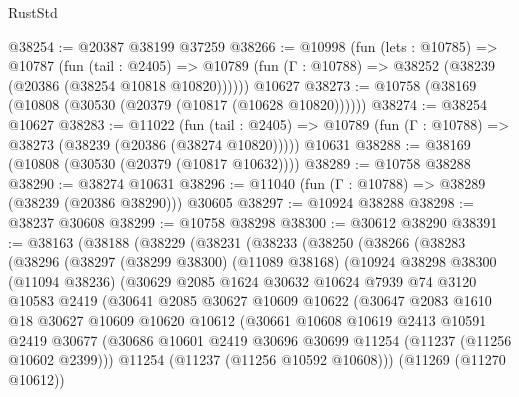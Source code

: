 \begin{lexlean}{RustStd}
\begin{coremodule}
@38254 := @20387 @38199 @37259
@38266 := @10998
    (fun (lets : @10785) =>
    @10787
      (fun (tail : @2405) =>
      @10789 (fun (Γ : @10788) => @38252 (@38239 (@20386 (@38254 @10818 @10820))))))
    @10627
@38273 := @10758 (@38169 (@10808 (@30530 (@20379 (@10817 (@10628 @10820))))))
@38274 := @38254 @10627
@38283 := @11022
    (fun (tail : @2405) => @10789 (fun (Γ : @10788) => @38273 (@38239 (@20386 (@38274 @10820)))))
    @10631
@38288 := @38169 (@10808 (@30530 (@20379 (@10817 @10632))))
@38289 := @10758 @38288
@38290 := @38274 @10631
@38296 := @11040 (fun (Γ : @10788) => @38289 (@38239 (@20386 @38290))) @30605
@38297 := @10924 @38288
@38298 := @38237 @30608
@38299 := @10758 @38298
@38300 := @30612 @38290
@38391 := @38163
    (@38188
      (@38229
        (@38231
          (@38233
            (@38250
              (@38266
                (@38283
                  (@38296
                    (@38297
                      (@38299 @38300)
                      (@11089 @38168)
                      (@10924
                        @38298
                        @38300
                        (@11094 @38236)
                        (@30629
                          @2085
                          @1624
                          @30632
                          @10624
                          @7939
                          @74
                          @3120
                          @10583
                          @2419
                          (@30641
                            @2085
                            @30627
                            @10609
                            @10622
                            (@30647
                              @2083
                              @1610
                              @18
                              @30627
                              @10609
                              @10620
                              @10612
                              (@30661
                                @10608
                                @10619
                                @2413
                                @10591
                                @2419
                                @30677
                                (@30686
                                  @10601
                                  @2419
                                  @30696
                                  @30699
                                  @11254
                                  (@11237 (@11256 @10602 @2399)))
                                @11254
                                (@11237 (@11256 @10592 @10608)))
                              (@11269 (@11270 @10612))

\end{coremodule}
\end{lexlean}
